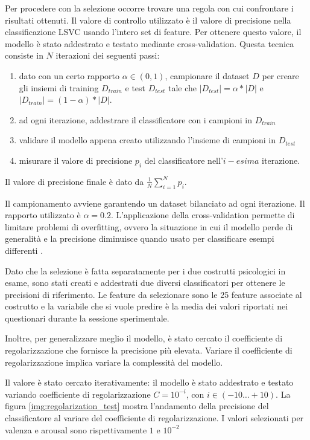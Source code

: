 Per procedere con la selezione occorre trovare una regola con cui confrontare i risultati ottenuti. Il valore di controllo utilizzato è il valore di precisione nella classificazione LSVC usando l'intero set di feature. Per ottenere questo valore, il modello è stato addestrato e testato mediante cross-validation. Questa tecnica consiste in $N$ iterazioni dei seguenti passi:
\begin{enumerate}
    \item dato con un certo rapporto $\alpha \in (0,1)$, campionare il dataset $D$ per creare gli insiemi di training $D_{train}$ e test $D_{test}$ tale che $|D_{test}| = \alpha * |D|$ e $|D_{train}| = (1-\alpha) * |D|$.
    \item ad ogni iterazione, addestrare il classificatore con i campioni in $D_{train}$
    \item validare il modello appena creato utilizzando l'insieme di campioni in $D_{test}$
    \item misurare il valore di precisione $p_{i}$ del classificatore nell'${i}-esima$ iterazione.
\end{enumerate}

Il valore di precisione finale è dato da $\frac{1}{N} \sum_{i=1}^{N} p_{i}$.

Il campionamento avviene garantendo un dataset bilanciato ad ogni iterazione. Il rapporto utilizzato è $\alpha=0.2$. L'applicazione della cross-validation permette di limitare problemi di overfitting, ovvero la situazione in cui il modello perde di generalità e la precisione diminuisce quando usato per classificare esempi differenti \cite{arlot2010survey}.

Dato che la selezione è fatta separatamente per i due costrutti psicologici in esame, sono stati creati e addestrati due diversi classificatori per ottenere le precisioni di riferimento. Le feature da selezionare sono le 25 feature associate al costrutto e la variabile che si vuole predire è la media dei valori riportati nei questionari durante la sessione sperimentale.

Inoltre, per generalizzare meglio il modello, è stato cercato il coefficiente di regolarizzazione che fornisce la precisione più elevata. Variare il coefficiente di regolarizzazione implica variare la complessità del modello.

Il valore è stato cercato iterativamente: il modello è stato addestrato e testato variando coefficiente di regolarizzazione $C = 10^{-i}$, con $i\in(-10\dots+10)$. La figura \ref{img:regolarization_test} mostra l'andamento della precisione del classificatore al variare del coefficiente di regolarizzazione. I valori selezionati per valenza e arousal sono rispettivamente $1$ e $10^{-2}$


